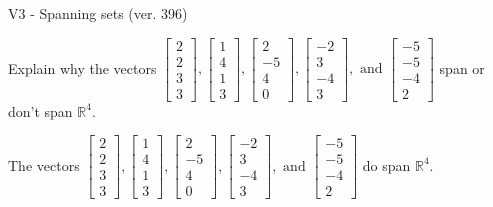 \begin{exercise}
  \begin{exerciseTitle}V3 - Spanning sets (ver. 396)\end{exerciseTitle}
  \begin{exerciseStatement}
    Explain why the vectors \(\left[\begin{array}{r}
2 \\
2 \\
3 \\
3
\end{array}\right] , \left[\begin{array}{r}
1 \\
4 \\
1 \\
3
\end{array}\right] , \left[\begin{array}{r}
2 \\
-5 \\
4 \\
0
\end{array}\right] , \left[\begin{array}{r}
-2 \\
3 \\
-4 \\
3
\end{array}\right] , \text{ and } \left[\begin{array}{r}
-5 \\
-5 \\
-4 \\
2
\end{array}\right]\) span or don't span \(\mathbb{R}^4\). 
	


  \end{exerciseStatement}
  \begin{exerciseAnswer}
   The vectors \(\left[\begin{array}{r}
2 \\
2 \\
3 \\
3
\end{array}\right] , \left[\begin{array}{r}
1 \\
4 \\
1 \\
3
\end{array}\right] , \left[\begin{array}{r}
2 \\
-5 \\
4 \\
0
\end{array}\right] , \left[\begin{array}{r}
-2 \\
3 \\
-4 \\
3
\end{array}\right] , \text{ and } \left[\begin{array}{r}
-5 \\
-5 \\
-4 \\
2
\end{array}\right]\) 
  	 do  
	span \(\mathbb{R}^4\).
  


  \end{exerciseAnswer}
\end{exercise}